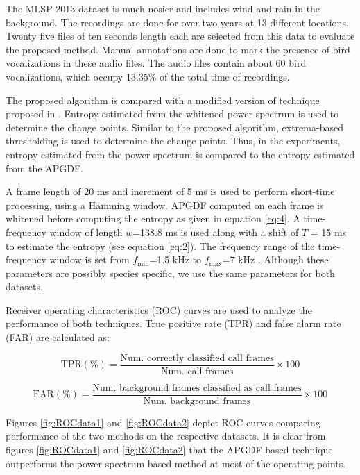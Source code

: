 \documentclass[a4paper]{article}
\begin{document}
The MLSP 2013 dataset \cite{data2} is much nosier and includes wind and rain in
the background. The recordings are done for over two years at 13 different
locations. Twenty five files of ten seconds length each are selected from this
data to evaluate the proposed method.  Manual annotations are done to mark the
presence of bird vocalizations in these audio files. The audio files contain
about 60 bird vocalizations, which occupy 13.35\% of the total time of
recordings.

The proposed algorithm is compared with a modified version of technique proposed
in \cite{wang2013}. Entropy estimated from the whitened power spectrum is used
to determine the change points. Similar to the proposed algorithm, extrema-based
thresholding is used to determine the change points. Thus, in the experiments,
entropy estimated from the power spectrum is compared to the entropy estimated
from the APGDF.
 
A frame length of 20 ms and increment of 5 ms is used to perform short-time
processing, using a Hamming window. APGDF computed on each frame is whitened before computing the
entropy as given in equation \ref{eq:4}. A time-frequency window of length $w$=138.8 ms
is used along with a shift of $T$ = 15 ms to estimate the entropy (see
equation \ref{eq:2}). The frequency range of the
time-frequency window is set from $f_{\min}$=1.5 kHz to $f_{\max}$=7 kHz
\cite{wang2013}. Although these parameters are possibly species specific, 
we use the same parameters for both datasets.

Receiver operating characteristics (ROC) curves are used to analyze the
performance of both techniques. True positive rate (TPR) and false alarm rate
(FAR) are calculated as:

\begin{equation}
\text{TPR} (\%)=\frac{\text{Num. correctly classified call frames}}
{\text{Num. call frames}} \times 100 
\end{equation}

\begin{equation}
\text{FAR} (\%)=\frac{\text{Num. background frames classified as call frames}}
{\text{Num. background frames}} \times 100 
\end{equation}

Figures \ref{fig:ROCdata1} and  \ref{fig:ROCdata2} depict ROC curves comparing
performance of the two methods on the respective datasets. It is clear from
figures \ref{fig:ROCdata1} and  \ref{fig:ROCdata2} that the APGDF-based
technique outperforms the power spectrum based method at most of the  operating
points.
\end{document}
